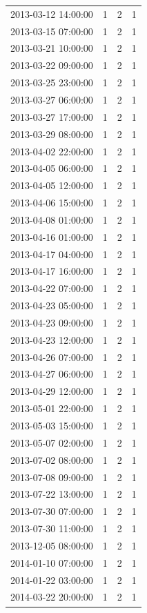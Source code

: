 \begin{tabular}{lrrr}
2013-03-12 14:00:00 & 1 & 2 & 1 \\
2013-03-15 07:00:00 & 1 & 2 & 1 \\
2013-03-21 10:00:00 & 1 & 2 & 1 \\
2013-03-22 09:00:00 & 1 & 2 & 1 \\
2013-03-25 23:00:00 & 1 & 2 & 1 \\
2013-03-27 06:00:00 & 1 & 2 & 1 \\
2013-03-27 17:00:00 & 1 & 2 & 1 \\
2013-03-29 08:00:00 & 1 & 2 & 1 \\
2013-04-02 22:00:00 & 1 & 2 & 1 \\
2013-04-05 06:00:00 & 1 & 2 & 1 \\
2013-04-05 12:00:00 & 1 & 2 & 1 \\
2013-04-06 15:00:00 & 1 & 2 & 1 \\
2013-04-08 01:00:00 & 1 & 2 & 1 \\
2013-04-16 01:00:00 & 1 & 2 & 1 \\
2013-04-17 04:00:00 & 1 & 2 & 1 \\
2013-04-17 16:00:00 & 1 & 2 & 1 \\
2013-04-22 07:00:00 & 1 & 2 & 1 \\
2013-04-23 05:00:00 & 1 & 2 & 1 \\
2013-04-23 09:00:00 & 1 & 2 & 1 \\
2013-04-23 12:00:00 & 1 & 2 & 1 \\
2013-04-26 07:00:00 & 1 & 2 & 1 \\
2013-04-27 06:00:00 & 1 & 2 & 1 \\
2013-04-29 12:00:00 & 1 & 2 & 1 \\
2013-05-01 22:00:00 & 1 & 2 & 1 \\
2013-05-03 15:00:00 & 1 & 2 & 1 \\
2013-05-07 02:00:00 & 1 & 2 & 1 \\
2013-07-02 08:00:00 & 1 & 2 & 1 \\
2013-07-08 09:00:00 & 1 & 2 & 1 \\
2013-07-22 13:00:00 & 1 & 2 & 1 \\
2013-07-30 07:00:00 & 1 & 2 & 1 \\
2013-07-30 11:00:00 & 1 & 2 & 1 \\
2013-12-05 08:00:00 & 1 & 2 & 1 \\
2014-01-10 07:00:00 & 1 & 2 & 1 \\
2014-01-22 03:00:00 & 1 & 2 & 1 \\
2014-03-22 20:00:00 & 1 & 2 & 1 \\

\end{tabular}
